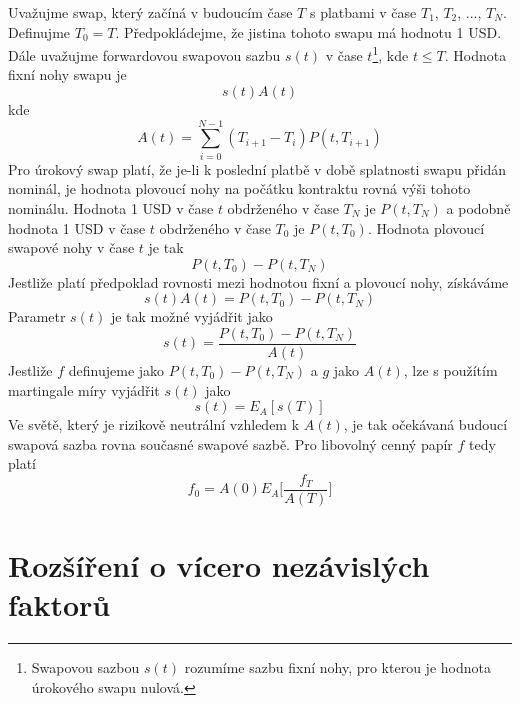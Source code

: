 \documentclass[a4paper]{book}
\begin{document}
Uvažujme swap, který začíná v budoucím čase $T$ s platbami v čase $T_1$, $T_2$, ..., $T_N$. Definujme $T_0 = T$. Předpokládejme, že jistina tohoto swapu má hodnotu 1 USD. Dále uvažujme forwardovou swapovou sazbu $s(t)$ v čase $t$\footnote{Swapovou sazbou $s(t)$ rozumíme sazbu fixní nohy, pro kterou je hodnota úrokového swapu nulová.}, kde $t \le T$. Hodnota fixní nohy swapu je
\begin{equation*}
s(t)A(t)
\end{equation*}
kde
\begin{equation*}
A(t) = \sum^{N-1}_{i=0}(T_{i+1}-T_i)P(t, T_{i+1})
\end{equation*}
Pro úrokový swap platí, že je-li k poslední platbě v době splatnosti swapu přidán nominál, je hodnota plovoucí nohy na počátku kontraktu rovná výši tohoto nominálu. Hodnota 1 USD v čase $t$ obdrženého v čase $T_N$ je $P(t, T_N)$ a podobně hodnota 1 USD v čase $t$ obdrženého v čase $T_0$ je $P(t, T_0)$. Hodnota plovoucí swapové nohy v čase $t$ je tak
\begin{equation*}
P(t,T_0) - P(t,T_N)
\end{equation*}
Jestliže platí předpoklad rovnosti mezi hodnotou fixní a plovoucí nohy, získáváme
\begin{equation*}
s(t)A(t) = P(t,T_0) - P(t,T_N)
\end{equation*}
Parametr $s(t)$ je tak možné vyjádřit jako
\begin{equation*}
s(t) = \frac{P(t,T_0) - P(t,T_N)}{A(t)}
\end{equation*}
Jestliže $f$ definujeme jako $P(t,T_0) - P(t,T_N)$ a $g$ jako $A(t)$, lze s použítím martingale míry vyjádřit $s(t)$ jako
\begin{equation*}
s(t) = E_A[s(T)]
\end{equation*}
Ve světě, který je rizikově neutrální vzhledem k $A(t)$, je tak očekávaná budoucí swapová sazba rovna současné swapové sazbě. Pro libovolný cenný papír $f$ tedy platí
\begin{equation*}
f_0 = A(0)E_A\Bigg[\frac{f_T}{A(T)} \Bigg]
\end{equation*}

\section{Rozšíření o vícero nezávislých faktorů}
\end{document}
